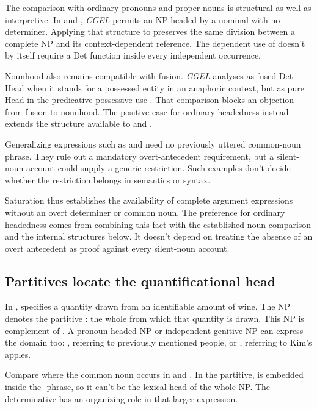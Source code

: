 \documentclass[12pt]{article}
\begin{document}
The comparison with ordinary pronouns and proper nouns is structural as well as interpretive. In  and , \textit{CGEL} permits an NP headed by a nominal with no determiner. Applying that structure to  preserves the same division between a complete NP and its context-dependent reference. The dependent use of  doesn't by itself require a Det function inside every independent occurrence.

Nounhood also remains compatible with fusion. \textit{CGEL} analyses  as fused Det--Head when it stands for a possessed entity in an anaphoric context, but as pure Head in the predicative possessive use  \citep[410--411]{huddleston2002}. That comparison blocks an objection from fusion to nounhood. The positive case for ordinary headedness instead extends the structure available to  and .

Generalizing expressions such as  and  need no previously uttered common-noun phrase. They rule out a mandatory overt-antecedent requirement, but a silent-noun account could supply a generic restriction. Such examples don't decide whether the restriction belongs in semantics or syntax.

Saturation thus establishes the availability of complete argument expressions without an overt determiner or common noun. The preference for ordinary headedness comes from combining this fact with the established noun comparison and the internal structures below. It doesn't depend on treating the absence of an overt antecedent as proof against every silent-noun account.

\subsection{Partitives locate the quantificational head}

In ,  specifies a quantity drawn from an identifiable amount of wine. The NP  denotes the partitive : the whole from which that quantity is drawn. This NP is complement of . A pronoun-headed NP or independent genitive NP can express the domain too: , referring to previously mentioned people, or , referring to Kim's apples.

Compare where the common noun occurs in  and . In the partitive,  is embedded inside the -phrase, so it can't be the lexical head of the whole NP. The determinative  has an organizing role in that larger expression.
\end{document}
